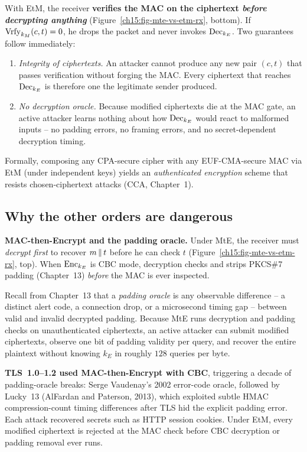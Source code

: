 \begin{whybox}
With EtM, the receiver \textbf{verifies the MAC on the ciphertext \emph{before decrypting anything}} (Figure~\ref{ch15:fig-mte-vs-etm-rx}, bottom). If $\operatorname{Vrfy}_{k_M}(c,t) = 0$, he drops the packet and never invokes $\operatorname{Dec}_{k_E}$. Two guarantees follow immediately:
\begin{enumerate}
  \item \emph{Integrity of ciphertexts.} An attacker cannot produce any new pair $(c,t)$ that passes verification without forging the MAC. Every ciphertext that reaches $\operatorname{Dec}_{k_E}$ is therefore one the legitimate sender produced.
  \item \emph{No decryption oracle.} Because modified ciphertexts die at the MAC gate, an active attacker learns nothing about how $\operatorname{Dec}_{k_E}$ would react to malformed inputs -- no padding errors, no framing errors, and no secret-dependent decryption timing.
\end{enumerate}
Formally, composing any CPA-secure cipher with any EUF-CMA-secure MAC via EtM (under independent keys) yields an \emph{authenticated encryption} scheme that resists chosen-ciphertext attacks (CCA, Chapter~1).
\end{whybox}

\subsection{Why the other orders are dangerous}

\begin{attackbox}
\textbf{MAC-then-Encrypt and the padding oracle.} Under MtE, the receiver must \emph{decrypt first} to recover $m\,\|\, t$ before he can check $t$ (Figure~\ref{ch15:fig-mte-vs-etm-rx}, top). When $\operatorname{Enc}_{k_E}$ is CBC mode, decryption checks and strips PKCS\#7 padding (Chapter~13) \emph{before} the MAC is ever inspected.

Recall from Chapter~13 that a \emph{padding oracle} is any observable difference -- a distinct alert code, a connection drop, or a microsecond timing gap -- between valid and invalid decrypted padding. Because MtE runs decryption and padding checks on unauthenticated ciphertexts, an active attacker can submit modified ciphertexts, observe one bit of padding validity per query, and recover the entire plaintext without knowing $k_E$ in roughly $128$ queries per byte.

\textbf{TLS~1.0--1.2 used MAC-then-Encrypt with CBC}, triggering a decade of padding-oracle breaks: Serge Vaudenay's 2002 error-code oracle, followed by Lucky~13 (AlFardan and Paterson, 2013), which exploited subtle HMAC compression-count timing differences after TLS hid the explicit padding error. Each attack recovered secrets such as HTTP session cookies. Under EtM, every modified ciphertext is rejected at the MAC check before CBC decryption or padding removal ever runs.
\end{attackbox}

